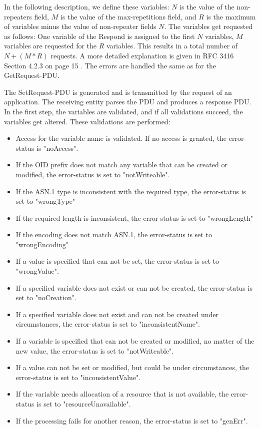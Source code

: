 In the following description, we define these variables: $N$ is the value of the non-repeaters field, $M$ is the value of the max-repetitions field, and $R$ is the maximum of variables minus the value of non-repeater fields $N$. The variables get requested as follows: One variable of the Respond is assigned to the first $N$ variables, $M$ variables are requested for the $R$ variables. This results in a total number of $N + (M * R)$ requests. A more detailed explanation is given in RFC 3416 Section 4.2.3 on page 15 \cite{RFC:RFC3416:2002}. The errors are handled the same as for the GetRequest-PDU.

\newpage
The SetRequest-PDU is generated and is transmitted by the request of an application. The receiving entity parses the PDU and produces a response PDU. In the first step, the variables are validated, and if all validations succeed, the variables get altered. These validations are performed:

\begin{itemize}
    \item Access for the variable name is validated. If no access is granted, the error-status is "noAccess".
    \item If the OID prefix does not match any variable that can be created or modified, the error-status is set to "notWriteable".
    \item If the ASN.1 type is inconsistent with the required type, the error-status is set to "wrongType"
    \item If the required length is inconsistent, the error-status is set to "wrongLength"
    \item If the encoding does not match ASN.1, the error-status is set to "wrongEncoding"
    \item If a value is specified that can not be set, the error-status is set to "wrongValue".
    \item If a specified variable does not exist or can not be created, the error-status is set to "noCreation".
    \item If a specified variable does not exist and can not be created under circumstances, the error-status is set to "inconsistentName".
    \item If a variable is specified that can not be created or modified, no matter of the new value, the error-status is set to "notWriteable".
    \item If a value can not be set or modified, but could be under circumstances, the error-status is set to "inconsistentValue".
    \item If the variable needs allocation of a resource that is not available, the error-status is set to "resourceUnavailable".
    \item If the processing fails for another reason, the error-status is set to "genErr".
\end{itemize}

